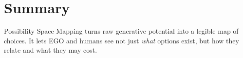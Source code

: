 \section{Summary}

Possibility Space Mapping turns raw generative potential into a legible
map of choices. It lets EGO and humans see not just \emph{what} options
exist, but how they relate and what they may cost.
